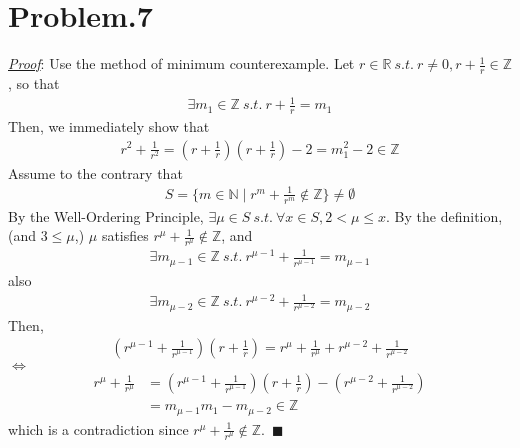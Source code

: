 \documentclass[12pt]{article}
\begin{document}
\section*{Problem.7}
\underline{\textit{Proof}}: Use the method of minimum counterexample. Let $r \in \mathbb{R} ~s.t.~ r \neq 0, r + \frac{1}{r} \in \mathbb{Z}$, so that
\begin{gather*}
\exists m_1 \in \mathbb{Z} ~s.t.~ r + \frac{1}{r} = m_1
\end{gather*}
Then, we immediately show that
\begin{gather*}
r^2 + \frac{1}{r^2} = \left( r + \frac{1}{r} \right) \left( r + \frac{1}{r} \right) - 2 = m_1^2 - 2 \in \mathbb{Z}
\end{gather*}
Assume to the contrary that
\begin{gather*}
S = \{ m \in \mathbb{N} \mid r^m + \frac{1}{r^m} \notin \mathbb{Z}\} \neq \emptyset
\end{gather*}
By the Well-Ordering Principle, $\exists \mu \in S ~s.t.~ \forall x \in S, 2 < \mu \leq x$.
By the definition, (and $3 \leq \mu$,) $\mu$ satisfies $r^{\mu} + \frac{1}{r^{\mu}} \notin \mathbb{Z}$, and
\begin{gather*}
\exists m_{\mu-1} \in \mathbb{Z} ~s.t.~ r^{\mu - 1} + \frac{1}{r^{\mu - 1}} = m_{\mu-1}
\end{gather*}
also 
\begin{gather*}
\exists m_{\mu-2} \in \mathbb{Z} ~s.t.~ r^{\mu - 2} + \frac{1}{r^{\mu - 2}} = m_{\mu-2}
\end{gather*}
Then, 
\begin{gather*}
\left(r^{\mu - 1} + \frac{1}{r^{\mu - 1}}\right) \left( r + \frac{1}{r} \right) = r^{\mu} + \frac{1}{r^{\mu}} + r^{\mu-2} + \frac{1}{r^{\mu - 2}}
\end{gather*}
$\Leftrightarrow$
\begin{align*}
r^{\mu} + \frac{1}{r^{\mu}} &= \left(r^{\mu - 1} + \frac{1}{r^{\mu - 1}}\right) \left( r + \frac{1}{r} \right) -\left(r^{\mu-2} + \frac{1}{r^{\mu - 2}}\right)\\[1em]
&= m_{\mu - 1} m_{1} - m_{\mu - 2} \in \mathbb{Z}
\end{align*}
which is a contradiction since $r^{\mu} + \frac{1}{r^{\mu}} \notin \mathbb{Z}$.~$\blacksquare$
\end{document}
